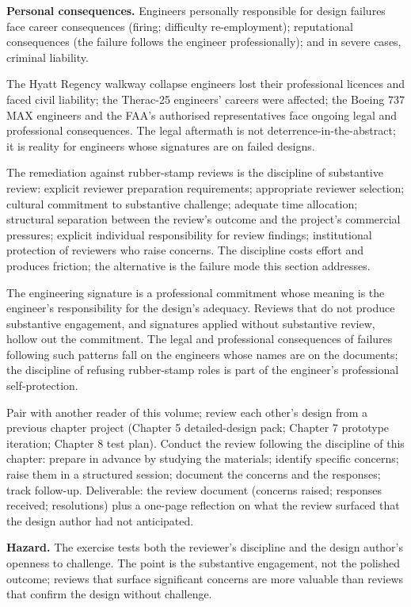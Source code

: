 \textbf{Personal consequences.} Engineers personally responsible for design failures face career consequences (firing; difficulty re-employment); reputational consequences (the failure follows the engineer professionally); and in severe cases, criminal liability.

The Hyatt Regency walkway collapse engineers lost their professional licences and faced civil liability; the Therac-25 engineers' careers were affected; the Boeing 737 MAX engineers and the FAA's authorised representatives face ongoing legal and professional consequences. The legal aftermath is not deterrence-in-the-abstract; it is reality for engineers whose signatures are on failed designs.

The remediation against rubber-stamp reviews is the discipline of substantive review: explicit reviewer preparation requirements; appropriate reviewer selection; cultural commitment to substantive challenge; adequate time allocation; structural separation between the review's outcome and the project's commercial pressures; explicit individual responsibility for review findings; institutional protection of reviewers who raise concerns. The discipline costs effort and produces friction; the alternative is the failure mode this section addresses.

\begin{principle}
The engineering signature is a professional commitment whose meaning is the engineer's responsibility for the design's adequacy. Reviews that do not produce substantive engagement, and signatures applied without substantive review, hollow out the commitment. The legal and professional consequences of failures following such patterns fall on the engineers whose names are on the documents; the discipline of refusing rubber-stamp roles is part of the engineer's professional self-protection.
\end{principle}

\begin{project}
Pair with another reader of this volume; review each other's design from a previous chapter project (Chapter 5 detailed-design pack; Chapter 7 prototype iteration; Chapter 8 test plan). Conduct the review following the discipline of this chapter: prepare in advance by studying the materials; identify specific concerns; raise them in a structured session; document the concerns and the responses; track follow-up. Deliverable: the review document (concerns raised; responses received; resolutions) plus a one-page reflection on what the review surfaced that the design author had not anticipated.

\textbf{Hazard.} The exercise tests both the reviewer's discipline and the design author's openness to challenge. The point is the substantive engagement, not the polished outcome; reviews that surface significant concerns are more valuable than reviews that confirm the design without challenge.
\end{project}

